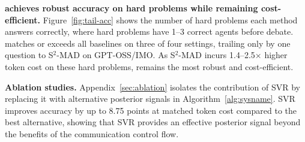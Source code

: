 \noindent\textbf{\sysname achieves robust accuracy on hard problems while remaining cost-efficient.} Figure~\ref{fig:tail-acc} shows the number of hard problems each method answers correctly, where hard problems have 1--3 correct agents before debate. \sysname matches or exceeds all baselines on three of four settings, trailing only by one question to S$^2$-MAD on GPT-OSS/IMO. As S$^2$-MAD incurs 1.4--2.5$\times$ higher token cost on these hard problems, \sysname remains the most robust and cost-efficient.

\noindent\textbf{Ablation studies.} Appendix~\ref{sec:ablation} isolates the contribution of SVR by replacing it with alternative posterior signals in Algorithm~\ref{alg:sysname}. SVR improves accuracy by up to 8.75 points at matched token cost compared to the best alternative, showing that SVR provides an effective posterior signal beyond the benefits of the communication control flow.
